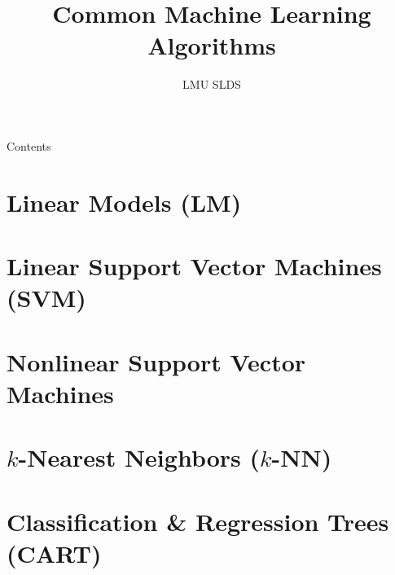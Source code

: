 





\title{Common Machine Learning Algorithms}
\author{LMU SLDS}
\date{}

\newcommand{\titlefigure}{figure_man/mckenzie_ai}
\newcommand{\titlefiguresize}{0.6}
\newcommand{\titlefiguresource}{https://www.vpnsrus.com/}







\lecturechapter{}

\begin{frame}{Contents}
  \tableofcontents
\end{frame}

\footnotesize

\section{Linear Models (LM)}


% 

\section{Linear Support Vector Machines (SVM)}


\section{Nonlinear Support Vector Machines}


\section{$k$-Nearest Neighbors ($k$-NN)}


\section{Classification \& Regression Trees (CART)}

% 
% 
% 
% 
% 
% 

\endlecture

